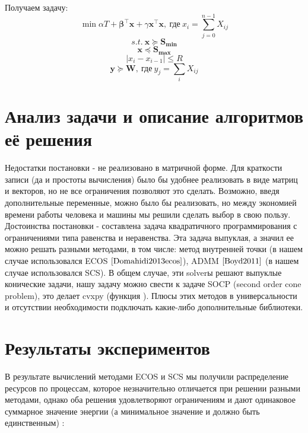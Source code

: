 \documentclass{article}
\begin{document}
Получаем задачу:\\
$$\min\limits_{} \alpha T + \mathbf{\beta^{\top}x} + \gamma \mathbf{x^{\top}x},~ \text{где}~ x_i = \sum \limits_{j=0}^{n-1} X_{ij}$$
$$s.t. ~\mathbf{x} \succeq \mathbf{S_{min}} $$
$$\mathbf{x} \preceq \mathbf{S_{max}}$$
$$|x_{i} - x_{i-1}| \le R$$
$$\mathbf{y} \succeq \mathbf{W},~ \text{где}~ y_j = \sum\limits_i X_{ij}$$


\section{Анализ задачи и описание алгоритмов её решения}

Недостатки постановки - не реализовано в матричной форме. Для краткости записи (да и простоты вычисления) было бы удобнее реализовать в виде матриц и векторов, но не все ограничения позволяют это сделать. Возможно, введя дополнительные переменные, можно было бы реализовать, но между экономией времени работы человека и машины мы решили сделать выбор в свою пользу.\\

Достоинства постановки - составлена задача квадратичного программирования с ограничениями типа равенства и неравенства. Эта задача выпуклая, а значил ее можно решать разными методами, в том числе: метод внутренней точки (в нашем случае использовался ECOS $\cite{Domahidi2013ecos}$), ADMM $\cite{Boyd2011}$ (в нашем случае использовался SCS). В общем случае, эти solverы решают выпуклые конические задачи, нашу задачу можно свести к задаче SOCP (second order cone problem), это делает cvxpy (функция ). Плюсы этих методов в универсальности и отсутствии необходимости подключать какие-либо дополнительные библиотеки. \\


\section{Результаты экспериментов}

В результате вычислений методами ECOS и SCS мы получили распределение ресурсов по процессам, которое незначительно отличается при решении разными методами, однако оба решения удовлетворяют ограничениям и дают одинаковое суммарное значение энергии (а минимальное значение и должно быть единственным) :
\end{document}
